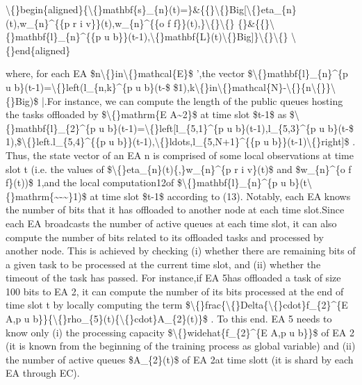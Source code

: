 \documentclass{article}
\begin{document}
\textbackslash\{\}begin\{aligned\}\{\textbackslash\{\}mathbf\{s\}\_\{n\}(t)=\}\&\{\{\}\textbackslash\{\}Big[\textbackslash\{\}eta\_\{n\}(t),w\_\{n\}\textasciicircum{}\{\{p r i v\}\}(t),w\_\{n\}\textasciicircum{}\{\{o f f\}\}(t),\}\textbackslash\{\}\textbackslash\{\} \{\}\&\{\{\}\textbackslash\{\}mathbf\{l\}\_\{n\}\textasciicircum{}\{\{p u b\}\}(t-1),\textbackslash\{\}mathbf\{L\}(t)\textbackslash\{\}Big]\}\textbackslash\{\}\textbackslash\{\} \textbackslash\{\}end\{aligned\}

where, for each EA \$n\textbackslash\{\}in\textbackslash\{\}mathcal\{E\}\$ ',the vector \$\textbackslash\{\}mathbf\{l\}\_\{n\}\textasciicircum{}\{p u b\}(t-1)=\textbackslash\{\}left(l\_\{n,k\}\textasciicircum{}\{p u b\}(t-\$ \$1),k\textbackslash\{\}in\textbackslash\{\}mathcal\{N\}-\textbackslash\{\}\{n\textbackslash\{\}\}\textbackslash\{\}Big)\$ |.For instance, we can compute the length of the public queues hosting the tasks offloaded by \$\textbackslash\{\}mathrm\{E A\textasciitilde{}2\}\$ at time slot \$t-1\$ as \$\textbackslash\{\}mathbf\{l\}\_\{2\}\textasciicircum{}\{p u b\}(t-1)=\textbackslash\{\}left[l\_\{5,1\}\textasciicircum{}\{p u b\}(t-1),l\_\{5,3\}\textasciicircum{}\{p u b\}(t-\$ 1),\$\textbackslash\{\}left.l\_\{5,4\}\textasciicircum{}\{\{p u b\}\}(t-1),\textbackslash\{\}ldots,l\_\{5,N+1\}\textasciicircum{}\{\{p u b\}\}(t-1)\textbackslash\{\}right]\$ . Thus, the state vector of an EA n is comprised of some local observations at time slot t (i.e. the values of \$\textbackslash\{\}eta\_\{n\}(t)\{,\}w\_\{n\}\textasciicircum{}\{p r i v\}(t)\$ and \$w\_\{n\}\textasciicircum{}\{o f f\}(t))\$ 1,and the local computation12of \$\textbackslash\{\}mathbf\{l\}\_\{n\}\textasciicircum{}\{p u b\}(t\textbackslash\{\}mathrm\{\textasciitilde{}-\textasciitilde{}\}1)\$ at time slot \$t-1\$ according to (13). Notably, each EA knows the number of bits that it has offloaded to another node at each time slot.Since each EA broadcasts the number of active queues at each time slot, it can also compute the number of bits related to its offloaded tasks and processed by another node. This is achieved by checking (i) whether there are remaining bits of a given task to be processed at the current time slot, and (ii) whether the timeout of the task has passed. For instance,if EA 5has offloaded a task of size 100 bits to EA 2, it can compute the number of its bits processed at the end of time slot t by locally computing the term \$\textbackslash\{\}frac\{\textbackslash\{\}Delta\{\textbackslash\{\}cdot\}f\_\{2\}\textasciicircum{}\{E A,p u b\}\}\{\textbackslash\{\}rho\_\{5\}(t)\{\textbackslash\{\}cdot\}A\_\{2\}(t)\}\$ . To this end. EA 5 needs to know only (i) the processing capacity \$\textbackslash\{\}widehat\{f\_\{2\}\textasciicircum{}\{E A,p u b\}\}\$ of EA 2 (it is known from the beginning of the training process as global variable) and (ii) the number of active queues \$A\_\{2\}(t)\$ of EA 2at time slott (it is shard by each EA through EC).
\end{document}
